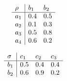 \documentclass[24pt,pdf,hyperref={unicode},aspectratio=169]{beamer}
\begin{document}
\begin{frame}
$$
\begin{array}{l| l l}
\rho & b_1 & b_2 \\ \hline
a_1 &0.4 & 0.5 \\
a_2 &0.1 & 0.3 \\
a_3 &0.5 & 0.8 \\
a_4 &0.6 & 0.2 \\
\end{array}
$$

$$
\begin{array}{l|l l l}
\sigma & c_1 & c_2 & c_3 \\ \hline
b_1 &0.5 &0.4& 0.4 \\ 
b_2 &0.6 &0.9& 0.2 \\
\end{array}
$$

\end{frame}
\end{document}
